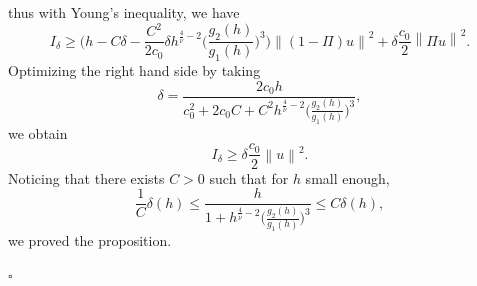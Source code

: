 \documentclass[12pt]{amsart}
\newcommand{\ep}{\hfill $\square$}
\numberwithin{equation}{section}
\numberwithin{figure}{section}
\newcommand{\vvert}[1]{\left\lVert#1\right\rVert}
\begin{document}
thus with Young's inequality, we have
\begin{equation*}
I_\delta \geq \Big(h-C\delta-\frac{C^2}{2c_0}\delta h^{\frac{4}{\overline\nu}-2}\Big(\frac{g_2(h)}{g_1(h)}\Big)^{3}\Big)\vvert{(1-\Pi)u}^2 + \delta\frac{c_0}{2}\vvert{\Pi u}^2.
\end{equation*}
Optimizing the right hand side by taking
\begin{equation*}
\delta = \frac{2c_0h}{c_0^2 + 2c_0C + C^2h^{\frac{4}{\overline\nu}-2}\Big(\frac{g_2(h)}{g_1(h)}\Big)^{3}},
\end{equation*}
we obtain
\begin{equation*}
I_\delta \geq \delta\frac{c_0}{2}\vvert{u}^2.
\end{equation*}
Noticing that there exists $C>0$ such that for $h$ small enough,
\begin{equation*}
\frac1C\delta(h)\leq\frac{h}{1 + h^{\frac{4}{\overline\nu}-2}\Big(\frac{g_2(h)}{g_1(h)}\Big)^{3}}\leq C\delta(h),
\end{equation*}
we proved the proposition.

\ep
\end{document}
